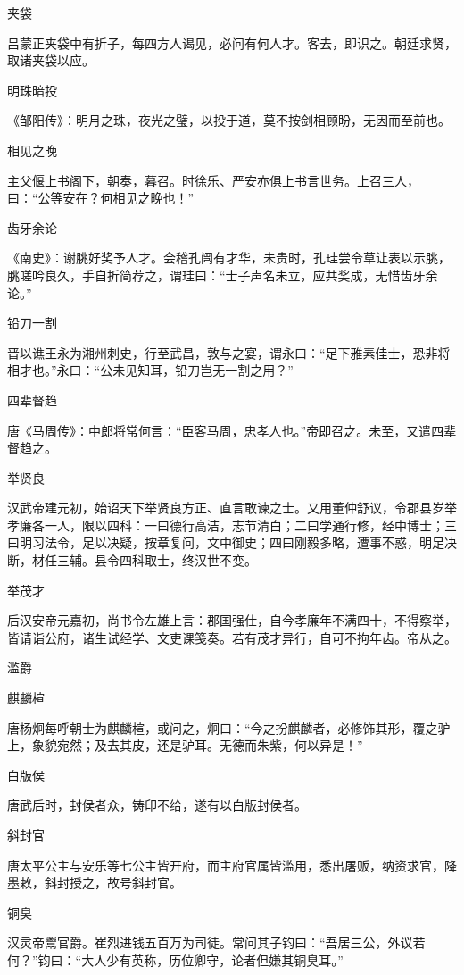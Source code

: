 \documentclass[a4paper,12pt,UTF8,twoside]{ctexbook}
\begin{document}
    夹袋
    
    吕蒙正夹袋中有折子，每四方人谒见，必问有何人才。客去，即识之。朝廷求贤，取诸夹袋以应。
    
    明珠暗投
    
    《邹阳传》：明月之珠，夜光之璧，以投于道，莫不按剑相顾盼，无因而至前也。
    
    相见之晚
    
    主父偃上书阁下，朝奏，暮召。时徐乐、严安亦俱上书言世务。上召三人，曰：“公等安在？何相见之晚也！”
    
    齿牙余论
    
    《南史》：谢朓好奖予人才。会稽孔闿有才华，未贵时，孔珪尝令草让表以示朓，朓嗟吟良久，手自折简荐之，谓珪曰：“士子声名未立，应共奖成，无惜齿牙余论。”
    
    铅刀一割
    
    晋以谯王永为湘州刺史，行至武昌，敦与之宴，谓永曰：“足下雅素佳士，恐非将相才也。”永曰：“公未见知耳，铅刀岂无一割之用？”
    
    四辈督趋
    
    唐《马周传》：中郎将常何言：“臣客马周，忠孝人也。”帝即召之。未至，又遣四辈督趋之。
    
    举贤良
    
    汉武帝建元初，始诏天下举贤良方正、直言敢谏之士。又用董仲舒议，令郡县岁举孝廉各一人，限以四科：一曰德行高洁，志节清白；二曰学通行修，经中博士；三曰明习法令，足以决疑，按章复问，文中御史；四曰刚毅多略，遭事不惑，明足决断，材任三辅。县令四科取士，终汉世不变。
    
    举茂才
    
    后汉安帝元嘉初，尚书令左雄上言：郡国强仕，自今孝廉年不满四十，不得察举，皆请诣公府，诸生试经学、文吏课笺奏。若有茂才异行，自可不拘年齿。帝从之。
    
    滥爵
    
    麒麟楦
    
    唐杨炯每呼朝士为麒麟楦，或问之，炯曰：“今之扮麒麟者，必修饰其形，覆之驴上，象貌宛然；及去其皮，还是驴耳。无德而朱紫，何以异是！”
    
    白版侯
    
    唐武后时，封侯者众，铸印不给，遂有以白版封侯者。
    
    斜封官
    
    唐太平公主与安乐等七公主皆开府，而主府官属皆滥用，悉出屠贩，纳资求官，降墨敕，斜封授之，故号斜封官。
    
    铜臭
    
    汉灵帝鬻官爵。崔烈进钱五百万为司徒。常问其子钧曰：“吾居三公，外议若何？”钧曰：“大人少有英称，历位卿守，论者但嫌其铜臭耳。”
    
\end{document}
